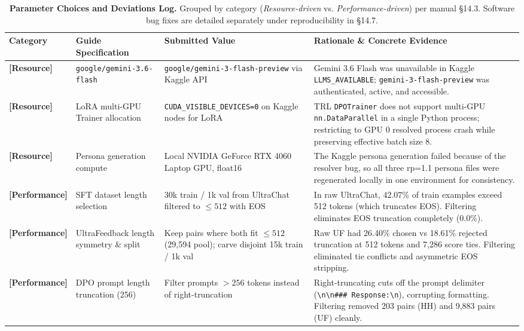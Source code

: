 \documentclass[11pt,a4paper]{article}
\begin{document}
\begin{table}[t]
\centering
\scriptsize
\setlength{\tabcolsep}{2.5pt}
\renewcommand{\arraystretch}{0.88}
\caption{\textbf{Parameter Choices and Deviations Log.} Grouped by category (\textit{Resource-driven} vs. \textit{Performance-driven}) per manual \S14.3. Software bug fixes are detailed separately under reproducibility in \S14.7.}
\label{tab:deviations}
\begin{tabularx}{\textwidth}{lp{2.5cm}p{3.2cm}X}
\toprule
\textbf{Category} & \textbf{Guide Specification} & \textbf{Submitted Value} & \textbf{Rationale \& Concrete Evidence} \\
\midrule
\textbf{[Resource]} & \texttt{google/gemini-3.6-flash} & \texttt{google/gemini-3-flash-preview} via Kaggle API & Gemini 3.6 Flash was unavailable in Kaggle \texttt{LLMS\_AVAILABLE}; \texttt{gemini-3-flash-preview} was authenticated, active, and accessible. \\
\textbf{[Resource]} & LoRA multi-GPU Trainer allocation & \texttt{CUDA\_VISIBLE\_DEVICES=0} on Kaggle nodes for LoRA & TRL \texttt{DPOTrainer} does not support multi-GPU \texttt{nn.DataParallel} in a single Python process; restricting to GPU 0 resolved process crash while preserving effective batch size 8. \\
\textbf{[Resource]} & Persona generation compute & Local NVIDIA GeForce RTX 4060 Laptop GPU, float16 & The Kaggle persona generation failed because of the resolver bug, so all three rp=1.1 persona files were regenerated locally in one environment for consistency. \\
\midrule
\textbf{[Performance]} & SFT dataset length selection & 30k train / 1k val from UltraChat filtered to $\le 512$ with EOS & In raw UltraChat, 42.07\% of train examples exceed 512 tokens (which truncates EOS). Filtering eliminates EOS truncation completely (0.0\%). \\
\textbf{[Performance]} & UltraFeedback length symmetry \& split & Keep pairs where both fit $\le 512$ (29,594 pool); carve disjoint 15k train / 1k val & Raw UF had 26.40\% chosen vs 18.61\% rejected truncation at 512 tokens and 7,286 score ties. Filtering eliminated tie conflicts and asymmetric EOS stripping. \\
\textbf{[Performance]} & DPO prompt length truncation (256) & Filter prompts $> 256$ tokens instead of right-truncation & Right-truncating cuts off the prompt delimiter (\texttt{\textbackslash n\textbackslash n\#\#\# Response:\textbackslash n}), corrupting formatting. Filtering removed 203 pairs (HH) and 9,883 pairs (UF) cleanly. \\

\end{tabularx}
\end{table}
\end{document}
